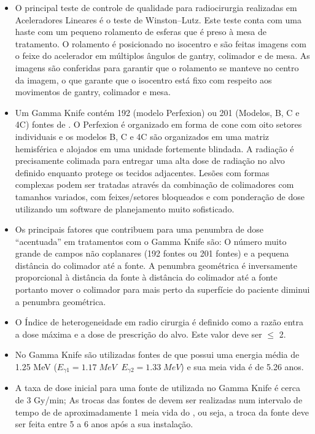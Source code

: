\documentclass[11pt,a4paper]{article}
\newcounter{exemplo}
\begin{document}
\begin{exemplo}
\begin{itemize}
        \item O principal teste de controle de qualidade para radiocirurgia realizadas em Aceleradores Lineares é o teste de Winston–Lutz. Este teste conta com uma haste com um pequeno rolamento de esferas que é preso à mesa de tratamento. O rolamento é posicionado no isocentro e são feitas imagens com o feixe do acelerador em múltiplos ângulos de gantry, colimador e de mesa. As imagens são conferidas para garantir que o rolamento se manteve no centro da imagem, o que garante que o isocentro está fixo com respeito aos movimentos de gantry, colimador e mesa.
        
        \item Um Gamma Knife contém 192 (modelo Perfexion) ou 201 (Modelos, B, C e 4C) fontes de . O Perfexion é organizado em forma de cone com oito setores individuais e os modelos B, C e 4C são organizados em uma matriz hemisférica e alojados em uma unidade fortemente blindada. A radiação é precisamente colimada para entregar uma alta dose de radiação no alvo definido enquanto protege os tecidos adjacentes. Lesões com formas complexas podem ser tratadas através da combinação de colimadores com tamanhos variados, com feixes/setores bloqueados e com ponderação de dose utilizando um software de planejamento muito sofisticado.
        
        \item Os principais fatores que contribuem para uma penumbra de dose ``acentuada'' em tratamentos com o Gamma Knife são: O número muito grande de campos não coplanares (192 fontes ou 201 fontes) e a pequena distância do colimador até a fonte. A penumbra geométrica é inversamente proporcional à distância da fonte à distância do colimador até a fonte portanto mover o colimador para mais perto da superfície do paciente diminui a penumbra geométrica.
        
        \item O Índice de heterogeneidade em radio cirurgia é definido como a razão entra a dose máxima e a dose de prescrição do alvo. Este valor deve ser $\leq$ 2.
        
        \item No Gamma Knife são utilizadas fontes de  que possui uma energia média de 1.25 MeV ($E_{\gamma 1} = 1.17 \; MeV \; \;  E_{\gamma 2} = 1.33 \; MeV$) e sua meia vida é de 5.26 anos.
        
        \item A taxa de dose inicial para uma fonte de  utilizada no Gamma Knife é cerca de 3 Gy/min; As trocas das fontes de  devem ser realizadas num intervalo de tempo de de aproximadamente 1 meia vida do , ou seja, a troca da fonte deve ser feita entre 5 a 6 anos após a sua instalação.
        

\end{itemize}
\end{exemplo}
\end{document}
